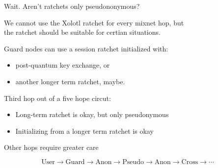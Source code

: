 \documentclass[fleqn,xcolor={usenames,dvipsnames}]{beamer}
\begin{document}
\begin{frame}{Wait. Aren't ratchets only pseudononymous? }

We cannot use the Xolotl ratchet for every mixnet hop, but \\
the ratchet should be suitable for certian situations.

\bigskip

Guard nodes can use a session ratchet initialized with:
\begin{itemize}
\item post-quantum key exchange, or 
\item another longer term ratchet, maybe.
\end{itemize}

\bigskip

Third hop out of a five hope circut: \\
\begin{itemize}
\item Long-term ratchet is okay, but only pseudonymous
\item Initializing from a longer term ratchet is okay
\end{itemize}

\bigskip
Other hops require greater care

\[ \textrm{User} \to \textrm{Guard} \to \textrm{Anon} \to \textrm{Pseudo} \to \textrm{Anon} \to \textrm{Cross} \to \cdots \]

\end{frame}
\end{document}
